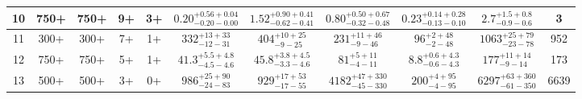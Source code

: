 \documentclass[11pt, oneside]{article}
\begin{document}
\begin{table}
{\begin{tabular}{ |c|c|c|c|c||c|c|c|c||c|c| }
10 & 750+ & 750+ & 9+ & 3+ & $0.20^{+0.56+0.04}_{-0.20-0.00}$ & $1.52^{+0.90+0.41}_{-0.62-0.41}$ & $0.80^{+0.50+0.67}_{-0.32-0.48}$ & $0.23^{+0.14+0.28}_{-0.13-0.10}$ & $2.7^{+1.5+0.8}_{-0.9-0.6}$ & 3 \\ \hline
11 & 300+ & 300+ & 7+ & 1+ & $332^{+13+33}_{-12-31}$ & $404^{+10+25}_{- 9-25}$ & $231^{+11+46}_{- 9-46}$ & $96^{+ 2+48}_{- 2-48}$ & $1063^{+25+79}_{-23-78}$ & 952 \\ \hline
12 & 750+ & 750+ & 5+ & 1+ & $41.3^{+5.5+4.8}_{-4.5-4.6}$ & $45.8^{+3.8+4.5}_{-3.3-4.6}$ & $81^{+ 5+11}_{- 4-11}$ & $8.8^{+0.6+4.3}_{-0.6-4.3}$ & $177^{+11+14}_{- 9-14}$ & 173 \\ \hline
13 & 500+ & 500+ & 3+ & 0+ & $986^{+25+90}_{-24-83}$ & $929^{+17+53}_{-17-55}$ & $4182^{+47+330}_{-45-330}$ & $200^{+ 4+95}_{- 4-95}$ & $6297^{+63+360}_{-61-350}$ & 6639 \\ \hline
\end{tabular}}
\end{table}
\end{document}
